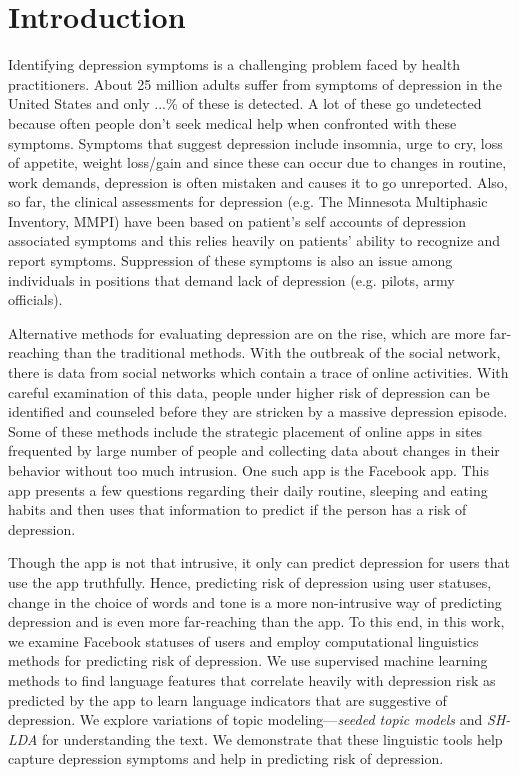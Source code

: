 \section{Introduction}
\label{sec:introduction}

Identifying depression symptoms is a challenging problem faced by health practitioners. About 25 million adults suffer from symptoms of depression in the United States \cite{} and only ...\% of these is detected. A lot of these go undetected because often people don't seek medical help when confronted with these symptoms. Symptoms that suggest depression include insomnia, urge to cry, loss of appetite, weight loss/gain and since these can occur due to changes in routine, work demands, depression is often mistaken and causes it to go unreported. Also, so far, the clinical assessments for depression (e.g. The Minnesota Multiphasic Inventory, MMPI) have been based on patient's self accounts of depression associated symptoms and this relies heavily on patients' ability to recognize and report symptoms. Suppression of these symptoms is also an issue among individuals in positions that demand lack of depression (e.g. pilots, army officials). 

Alternative methods for evaluating depression are on the rise, which are more far-reaching than the traditional methods. With the outbreak of the social network, there is data from social networks which contain a trace of online activities. With careful examination of this data, people under higher risk of depression can be identified and counseled before they are stricken by a massive depression episode. Some of these methods include the strategic placement of online apps in sites frequented by large number of people and collecting data about changes in their behavior without too much intrusion. One such app is the Facebook app. This app presents a few questions regarding their daily routine, sleeping and eating habits and then uses that information to predict if the person has a risk of depression. 


Though the app is not that intrusive, it only can predict depression for users that use the app truthfully. Hence, predicting risk of depression using user statuses, change in the choice of words and tone is a more non-intrusive way of predicting depression and is even more far-reaching than the app. To this end, in this work, we examine Facebook statuses of users and employ computational linguistics methods for predicting risk of depression. We use supervised machine learning methods to find language features that correlate heavily with depression risk as predicted by the app to learn language indicators that are suggestive of depression.
We explore variations of topic modeling---\textit{seeded topic models} \cite{} and \textit{SH-LDA} \cite{} for understanding the text. We demonstrate that these linguistic tools help capture depression symptoms and help in predicting risk of depression.

